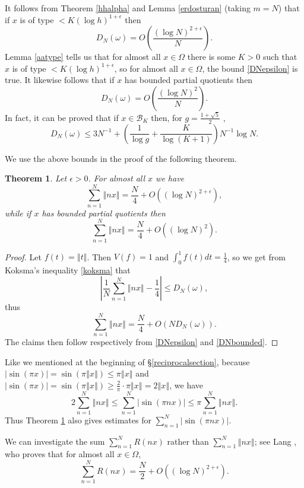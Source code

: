 \documentclass{amsart}
\newcommand{\norm}[1]{\left\Vert #1 \right\Vert}
\newtheorem{theorem}{Theorem}
\begin{document}
It follows from Theorem \ref{hhalpha} and Lemma \ref{erdosturan} (taking $m=N$) that if $x$ is of type $<K(\log h)^{1+\epsilon}$ then
\begin{equation}
D_N(\omega)=O\left( \frac{(\log N)^{2+\epsilon}}{N} \right).
\label{DNepsilon}
\end{equation}
Lemma \ref{aatype} tells us that for  almost all $x \in \Omega$ there is some $K>0$ such that $x$ is of type $<K(\log h)^{1+\epsilon}$, so for almost
all $x \in \Omega$, the bound \eqref{DNepsilon} is true. 
It likewise  follows that if $x$ has bounded partial quotients then 
\begin{equation}
D_N(\omega)=O\left( \frac{(\log N)^2}{N} \right).
\label{DNbounded}
\end{equation}
In fact, it can be proved that if $x \in \mathcal{B}_K$ then, for $g = \frac{1+\sqrt{5}}{2}$ \cite[p.~125, Theorem 3.4]{kuipers},
\[
D_N(\omega) \leq  3N^{-1} + \left( \frac{1}{\log g} + \frac{K}{\log(K+1)} \right) N^{-1} \log N.
\]




We use the above bounds in the proof of the following theorem.

\begin{theorem}
Let $\epsilon>0$. For almost all $x$ we have
\[
\sum_{n=1}^N \norm{nx}=\frac{N}{4}+O((\log N)^{2+\epsilon}),
\]
while if $x$ has bounded partial quotients then
\[
\sum_{n=1}^N \norm{nx}=\frac{N}{4}+O((\log N)^2).
\]
\label{normsum}
\end{theorem}
\begin{proof}
Let $f(t)=\norm{t}$. Then $V(f)=1$ and $\int_0^1 f(t) dt=\frac{1}{4}$, so we get from Koksma's inequality \eqref{koksma} that
\[
\left| \frac{1}{N} \sum_{n=1}^N \norm{nx} - \frac{1}{4} \right| \leq D_N(\omega),
\]
thus
\[
\sum_{n=1}^N \norm{nx}=\frac{N}{4}+O(ND_N(\omega)).
\]
The claims then follow respectively from \eqref{DNepsilon} and \eqref{DNbounded}.
\end{proof}

Like we mentioned at the beginning of \S \ref{reciprocalsection},
because $|\sin(\pi x)|=\sin(\pi \norm{x}) \leq \pi \norm{x}$ and $|\sin(\pi x)| = \sin(\pi \norm{x}) \geq \frac{2}{\pi} \cdot \pi \norm{x}=2\norm{x}$, we have
\[
2\sum_{n=1}^N \norm{nx} \leq   \sum_{n=1}^N |\sin(\pi nx)|  \leq \pi \sum_{n=1}^N \norm{nx}.
\]
Thus Theorem \ref{normsum} also gives estimates for  $\sum_{n=1}^N |\sin(\pi nx)|$.

We can investigate the sum $\sum_{n=1}^N R(nx)$ rather than $\sum_{n=1}^N \norm{nx}$; see Lang \cite[p.~37, Theorem 1]{MR0209227}, who proves that
for almost all $x \in \Omega$,
\[
\sum_{n=1}^N R(nx)=\frac{N}{2}+O((\log N)^{2 + \epsilon}).
\]
\end{document}
